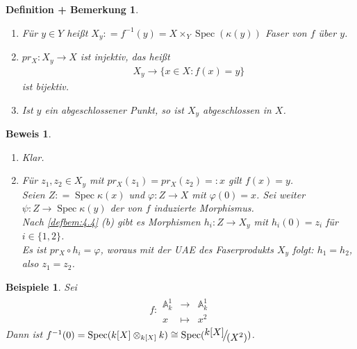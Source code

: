 \documentclass[a4paper,oneside]{scrbook}
\theoremstyle{break}
\newtheorem{DefBem}[Def]{Definition + Bemerkung}
\theoremstyle{nonumberbreak}
\newtheorem{nnBsp}{Beispiele}
\theoremstyle{nonumberplain}
\newtheorem{Bew}{Beweis}
\theoremstyle{break}
\newcommand{\defeqr}[0]{\mathrel{\mathop:}=}
\newcommand{\defeql}[0]{=\mathrel{\mathop:}}
\newcommand{\Abb}[5]{\ensuremath{#1:\begin{array}{ccc} #2 & \longrightarrow & #3 \\ #4 & \longmapsto & #5 \end{array}}}
\newcommand{\Spec}{%
	\ensuremath{\operatorname{Spec}}%
}
\newcommand{\FakRaum}[2]{
  \raisebox{0.7ex}{\ensuremath{#1}}
  \ensuremath{\mkern-3mu}\big/\ensuremath{\mkern-3mu}
  \raisebox{-0.6ex}{\ensuremath{#2}}}
\begin{document}
\begin{DefBem}
  \label{defbem:5.3}
  \begin{enumerate}
  \item Für $y\in Y$ heißt $X_y\defeqr f^{-1}(y)=X\times_Y\Spec(\kappa(y))$ \emph{Faser} von $f$ über $y$.
  \item $pr_X:X_y\to X$ ist injektiv, das heißt
    \begin{align*}
      X_y\to \{x\in X:f(x)=y\}
    \end{align*}
    ist bijektiv.
  \item Ist $y$ ein abgeschlossener Punkt, so ist $X_y$ abgeschlossen in $X$. 
  \end{enumerate}
\end{DefBem}

\begin{Bew}
  \begin{enumerate}
  \item[(c)] Klar.
  \item[(b)] Für $z_1,z_2\in X_y$ mit $pr_X(z_1)=pr_X(z_2)\defeql x$ gilt $f(x)=y$.\\
    Seien $Z\defeqr\Spec\kappa(x)$ und $\varphi:Z\to X$ mit $\varphi(0)=x$. Sei weiter $\psi:Z\to\Spec\kappa(y)$
    der von $f$ induzierte Morphismus. \\
    Nach \ref{defbem:4.4} (b) gibt es Morphismen $h_i:Z\to X_y$
    mit $h_i(0)=z_i$ für $i\in\{1,2\}$. \\
    Es ist $pr_X\circ h_i=\varphi$, woraus mit der UAE des Faserprodukts $X_y$ folgt: $h_1=h_2$, also $z_1=z_2$.
  \end{enumerate}
\end{Bew}

\begin{nnBsp}
  Sei
  \begin{align*}
    \Abb{f}{\mathbb A_k^1}{\mathbb A_k^1}{x}{x^2}
  \end{align*}
  Dann ist $f^{-1}(0)=\Spec(k[X]\otimes_{k[X]}k)\cong\Spec(\FakRaum{k[X]}{(X^2)})$.
\end{nnBsp}
\end{document}
